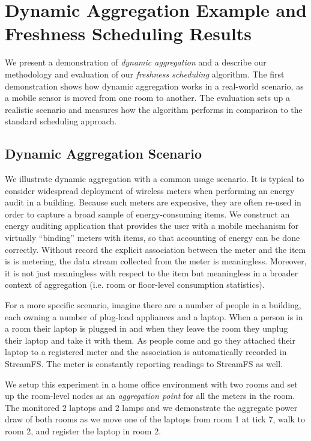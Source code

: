 \section{Dynamic Aggregation Example and Freshness Scheduling Results}


We present a demonstration of \emph{dynamic aggregation} and a describe our methodology and evaluation of
our \emph{freshness scheduling} algorithm.  The first demonstration shows how dynamic aggregation works in a real-world
scenario, as a mobile sensor is moved from one room to another.  The evaluation sets up a realistic scenario and
measures how the algorithm performs in comparison to the standard scheduling approach.

\subsection{Dynamic Aggregation Scenario}
We illustrate dynamic aggregation with a common usage scenario.  It is typical to consider widespread deployment 
of wireless meters when performing an energy audit in a building.  Because such meters are expensive, they are often 
re-used in order to capture a broad sample of energy-consuming items.  We construct an energy auditing application
that provides the user with a mobile mechanism for virtually ``binding'' meters with items, so that accounting of
energy can be done correctly.  Without record the explicit association between the meter and the item is is metering, 
the data stream collected from the meter is meaningless.  Moreover, it is not just meaningless with respect to the item
but meaningless in a broader context of aggregation (i.e. room or floor-level consumption statistics).

For a more specific scenario, imagine there are a number of people in a building,
each owning a number of plug-load appliances and a laptop.  When a person is in a room their laptop
is plugged in and when they leave the room they unplug their laptop and take it with them.  As people come and go
they attached their laptop to a registered meter and the association is automatically recorded in StreamFS.
The meter is constantly reporting readings to StreamFS as well.  

We setup this experiment in a home office environment with two rooms
and set up the room-level nodes as an \emph{aggregation point} for all the meters in the room.  The monitored
2 laptops and 2 lamps and we demonstrate the aggregate power draw of both rooms as we move one of the laptops from
room 1 at tick 7, walk to room 2, and register the laptop in room 2.

